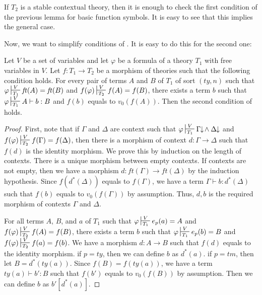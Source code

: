 \documentclass[reqno]{amsart}
\theoremstyle{definition}
\theoremstyle{remark}
\newcommand{\ft}{\mathit{ft}}
\newcommand{\ty}{\mathit{ty}}
\newcommand{\tm}{\mathit{tm}}
\numberwithin{figure}{section}
\begin{document}
\begin{remark}
If $T_2$ is a stable contextual theory, then it is enough to check the first condition of the previous lemma for basic function symbols.
It is easy to see that this implies the general case.
\end{remark}

Now, we want to simplify conditions of .
It is easy to do this for the second one:

\begin{lem}
Let $V$ be a set of variables and let $\varphi$ be a formula of a theory $T_1$ with free variables in $V$.
Let $f : T_1 \to T_2$ be a morphism of theories such that the following condition holds.
For every pair of terms $A$ and $B$ of $T_1$ of sort $(\ty,n)$ such that
$\varphi \sststile{T_1}{V} \ft(A) = \ft(B)$ and $f(\varphi) \sststile{T_2}{V} f(A) = f(B)$,
there exists a term $b$ such that $\varphi \sststile{T_1}{V} A \vdash b : B$ and $f(b)$ equals to $v_0(f(A))$.
Then the second condition of  holds.
\end{lem}
\begin{proof}
First, note that if $\Gamma$ and $\Delta$ are context such that $\varphi \sststile{T_1}{V} \Gamma\!\!\downarrow\!\land\:\Delta\!\!\downarrow$ and $f(\varphi) \sststile{T_2}{V} f(\Gamma) = f(\Delta)$,
then there is a morphism of context $d : \Gamma \to \Delta$ such that $f(d)$ is the identity morphism.
We prove this by induction on the length of contexts.
There is a unique morphism between empty contexts.
If contexts are not empty, then we have a morphism $d : \ft(\Gamma) \to \ft(\Delta)$ by the induction hypothesis.
Since $f(d^*(\Delta))$ equals to $f(\Gamma)$, we have a term $\Gamma \vdash b : d^*(\Delta)$ such that $f(b)$ equals to $v_0(f(\Gamma))$ by assumption.
Thus, $d,b$ is the required morphism of contexts $\Gamma$ and $\Delta$.

For all terms $A$, $B$, and $a$ of $T_1$ such that $\varphi \sststile{T_1}{V} e_p(a) = A$ and $f(\varphi) \sststile{T_2}{V} f(A) = f(B)$,
there exists a term $b$ such that $\varphi \sststile{T_1}{V} e_p(b) = B$ and $f(\varphi) \sststile{T_2}{V} f(a) = f(b)$.
We have a morphism $d : A \to B$ such that $f(d)$ equals to the identity morphism.
if $p = \ty$, then we can define $b$ as $d^*(a)$.
if $p = \tm$, then let $B = d^*(\ty(a))$.
Since $f(B) = f(\ty(a))$, we have a term $\ty(a) \vdash b' : B$ such that $f(b')$ equals to $v_0(f(B))$ by assumption.
Then we can define $b$ as $b'[d^*(a)]$.
\end{proof}
\end{document}
